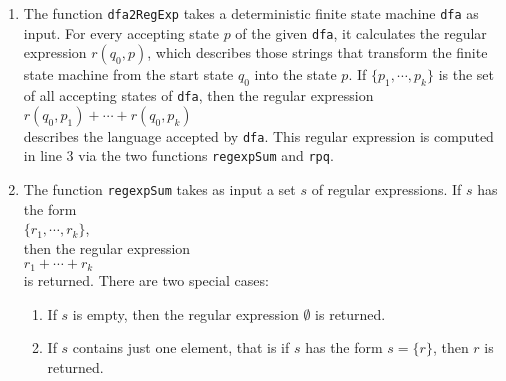 \begin{enumerate}
\item The function \texttt{dfa2RegExp} takes a deterministic finite state machine
      \texttt{dfa} as input.  For every accepting state $p$ of the given
      \texttt{dfa}, it calculates the regular expression $r(q_0,p)$, which describes those
      strings that transform the finite state machine from the start state $q_0$ into the
      state $p$.  If $\{p_1, \cdots, p_k\}$ is the set of all accepting states of
      \texttt{dfa}, then the regular expression
      \\[0.2cm]
      \hspace*{1.3cm}
      $r(q_0, p_1) + \cdots + r(q_0, p_k)$
      \\[0.2cm]
      describes the language accepted by \texttt{dfa}.  This regular expression is
      computed in line 3 via the two functions \texttt{regexpSum} and \texttt{rpq}.
\item The function \texttt{regexpSum} takes as input a set $s$ of regular expressions.
      If $s$ has the form
      \\[0.2cm]
      \hspace*{1.3cm}
      $\{ r_1, \cdots, r_k \}$,
      \\[0.2cm] 
      then the regular expression
      \\[0.2cm]
      \hspace*{1.3cm}
      $r_1 + \cdots + r_k$ 
      \\[0.2cm]
      is returned.  There are two special cases:
      \begin{enumerate}
      \item If $s$ is empty, then the regular expression $\emptyset$ is returned.
      \item If $s$ contains just one element, that is if $s$ has the form $s = \{r\}$, then $r$
            is returned.
      \end{enumerate}



\end{enumerate}
